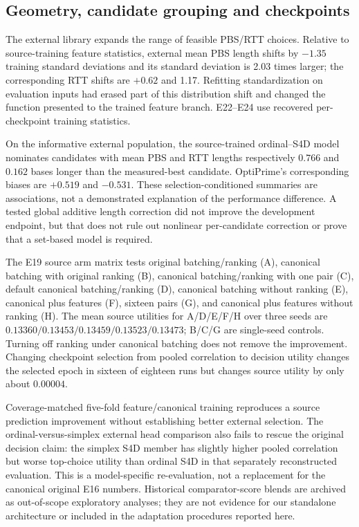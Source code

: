 \subsection{Geometry, candidate grouping and checkpoints}
The external library expands the range of feasible PBS/RTT choices. Relative to source-training feature statistics, external mean PBS length shifts by $-1.35$ training standard deviations and its standard deviation is 2.03 times larger; the corresponding RTT shifts are $+0.62$ and 1.17. Refitting standardization on evaluation inputs had erased part of this distribution shift and changed the function presented to the trained feature branch. E22--E24 use recovered per-checkpoint training statistics.

On the informative external population, the source-trained ordinal--S4D model nominates candidates with mean PBS and RTT lengths respectively $0.766$ and $0.162$ bases longer than the measured-best candidate. OptiPrime's corresponding biases are $+0.519$ and $-0.531$. These selection-conditioned summaries are associations, not a demonstrated explanation of the performance difference. A tested global additive length correction did not improve the development endpoint, but that does not rule out nonlinear per-candidate correction or prove that a set-based model is required.

The E19 source arm matrix tests original batching/ranking (A), canonical batching with original ranking (B), canonical batching/ranking with one pair (C), default canonical batching/ranking (D), canonical batching without ranking (E), canonical plus features (F), sixteen pairs (G), and canonical plus features without ranking (H). The mean source utilities for A/D/E/F/H over three seeds are $0.13360/0.13453/0.13459/0.13523/0.13473$; B/C/G are single-seed controls. Turning off ranking under canonical batching does not remove the improvement. Changing checkpoint selection from pooled correlation to decision utility changes the selected epoch in sixteen of eighteen runs but changes source utility by only about $0.00004$.

Coverage-matched five-fold feature/canonical training reproduces a source prediction improvement without establishing better external selection. The ordinal-versus-simplex external head comparison also fails to rescue the original decision claim: the simplex S4D member has slightly higher pooled correlation but worse top-choice utility than ordinal S4D in that separately reconstructed evaluation. This is a model-specific re-evaluation, not a replacement for the canonical original E16 numbers. Historical comparator-score blends are archived as out-of-scope exploratory analyses; they are not evidence for our standalone architecture or included in the adaptation procedures reported here.

